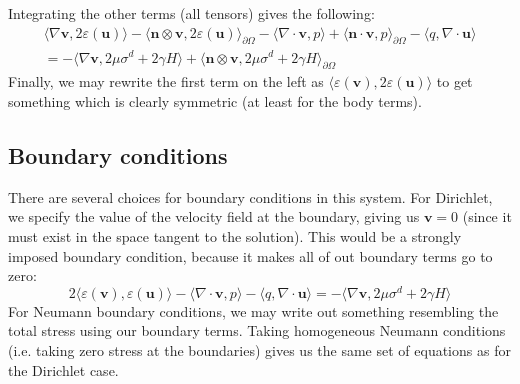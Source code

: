 \documentclass[reqno]{article}
\begin{document}
  Integrating the other terms (all tensors) gives the following:
  \begin{equation}
    \begin{split}
    \langle \nabla \mathbf{v}, 2 \varepsilon(\mathbf{u}) \rangle
    -\langle \mathbf{n} \otimes \mathbf{v}, 2 \varepsilon(\mathbf{u}) \rangle_{\partial \Omega}
    - \langle \nabla \cdot \mathbf{v}, p \rangle
    + \langle \mathbf{n} \cdot \mathbf{v}, p \rangle_{\partial \Omega}
    - \langle q, \nabla \cdot \mathbf{u} \rangle \\
    =
    -\langle \nabla \mathbf{v}, 2 \mu \sigma^d + 2 \gamma H \rangle
    + \langle \mathbf{n} \otimes \mathbf{v}, 2 \mu \sigma^d + 2 \gamma H \rangle_{\partial \Omega}
    \end{split}
  \end{equation}
  Finally, we may rewrite the first term on the left as $\langle
  \varepsilon(\mathbf{v}), 2 \varepsilon(\mathbf{u}) \rangle$ to get something
  which is clearly symmetric (at least for the body terms).

  \subsection{Boundary conditions}
  There are several choices for boundary conditions in this system.
  For Dirichlet, we specify the value of the velocity field at the boundary,
  giving us $\mathbf{v} = 0$ (since it must exist in the space tangent to the solution).
  This would be a strongly imposed boundary condition, because it makes all of
  out boundary terms go to zero:
  \begin{equation}
    2 \langle \varepsilon(\mathbf{v}), \varepsilon(\mathbf{u}) \rangle
    - \langle \nabla \cdot \mathbf{v}, p \rangle
    - \langle q, \nabla \cdot \mathbf{u} \rangle
    =
    - \langle \nabla \mathbf{v}, 2 \mu \sigma^d + 2 \gamma H \rangle
  \end{equation}
  For Neumann boundary conditions, we may write out something resembling the
  total stress using our boundary terms.
  Taking homogeneous Neumann conditions (i.e. taking zero stress at the
  boundaries) gives us the same set of equations as for the Dirichlet case.
\end{document}
